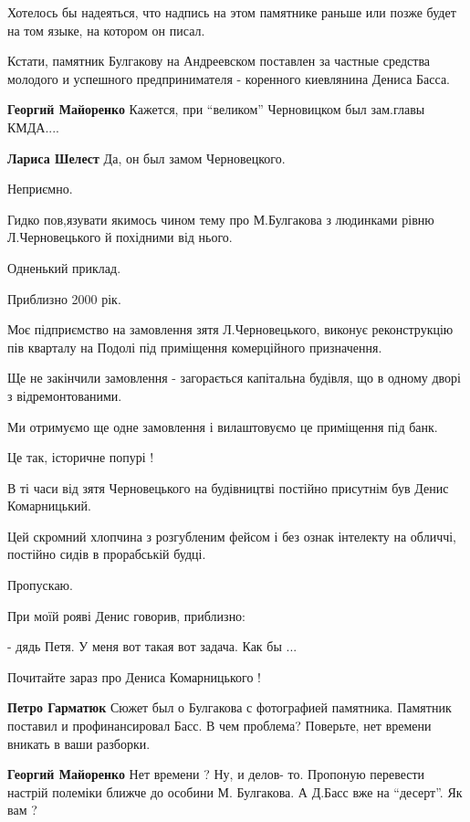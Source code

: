 \begin{itemize}
Хотелось бы надеяться, что надпись на этом памятнике раньше или позже будет на
том языке, на котором он писал.


Кстати, памятник Булгакову на Андреевском поставлен за частные средства
молодого и успешного предпринимателя - коренного киевлянина Дениса Басса.

\begin{itemize} %
\textbf{Георгий Майоренко} Кажется, при \enquote{великом} Черновицком был зам.главы КМДА....

\textbf{Лариса Шелест} Да, он был замом Черновецкого.

Неприємно.

Гидко пов,язувати якимось чином тему про М.Булгакова з людинками рівню
Л.Черновецького й похідними від нього.

Одненький приклад.

Приблизно 2000 рік.

Моє підприємство на замовлення зятя Л.Черновецького, виконує реконструкцію пів
кварталу на Подолі під приміщення комерційного призначення.

Ще не закінчили замовлення - загорається капітальна будівля, що в одному дворі
з відремонтованими.

Ми отримуємо ще одне замовлення і вилаштовуємо це приміщення під банк.

Це так, історичне попурі !

В ті часи від зятя Черновецького на будівництві постійно присутнім був Денис
Комарницький.

Цей скромний хлопчина з розгубленим фейсом і без ознак інтелекту на обличчі,
постійно сидів в прорабській будці.

Пропускаю.

При моїй рояві Денис говорив, приблизно:

- дядь Петя. У меня вот такая вот задача. Как бы ...

Почитайте зараз про Дениса Комарницького !

\begin{itemize} %
\textbf{Петро Гарматюк} Сюжет был о Булгакова с фотографией памятника. Памятник поставил и профинансировал Басс. В чем проблема? Поверьте, нет времени вникать в ваши разборки.

\textbf{Георгий Майоренко}
Нет времени ?
Ну, и делов- то.
Пропоную перевести настрій полеміки ближче до особини М. Булгакова.
А Д.Басс вже на \enquote{десерт}.
Як вам ?


\end{itemize}
\end{itemize}
\end{itemize}
